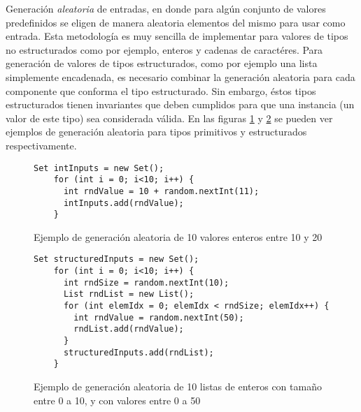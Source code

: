 Generaci\'on \emph{aleatoria} de entradas, en donde para alg\'un conjunto de valores predefinidos se eligen de manera aleatoria elementos del mismo para usar como entrada. Esta metodolog\'ia es muy sencilla de implementar para valores de tipos no estructurados como por ejemplo, enteros y cadenas de caract\'eres. Para generaci\'on de valores de tipos estructurados, como por ejemplo una lista simplemente encadenada, es necesario combinar la generaci\'on aleatoria para cada componente que conforma el tipo estructurado. Sin embargo, \'estos tipos estructurados tienen invariantes que deben cumplidos para que una instancia (un valor de este tipo) sea considerada v\'alida. En las figuras \ref{figures.examples.testing.random.primitive} y \ref{figures.examples.testing.random.structure} se pueden ver ejemplos de generaci\'on aleatoria para tipos primitivos y estructurados respectivamente. %

\begin{figure}
	\begin{lstlisting}[frame=single, mathescape=true,framexleftmargin=1.5em]
    Set intInputs = new Set();
    for (int i = 0; i<10; i++) {
      int rndValue = 10 + random.nextInt(11);
      intInputs.add(rndValue);
    }
	\end{lstlisting}
	\label{figures.examples.testing.random.primitive}
	\caption{Ejemplo de generaci\'on aleatoria de 10 valores enteros entre 10 y 20}
\end{figure}

\begin{figure}
	\begin{lstlisting}[frame=single, mathescape=true,framexleftmargin=1.5em]
    Set structuredInputs = new Set();
    for (int i = 0; i<10; i++) {
      int rndSize = random.nextInt(10);
      List rndList = new List();
      for (int elemIdx = 0; elemIdx < rndSize; elemIdx++) {
        int rndValue = random.nextInt(50);
        rndList.add(rndValue);
      }
      structuredInputs.add(rndList);
    }
	\end{lstlisting}
	\label{figures.examples.testing.random.structure}
	\caption{Ejemplo de generaci\'on aleatoria de 10 listas de enteros con tama\~no entre 0 a 10, y con valores entre 0 a 50}
\end{figure}

